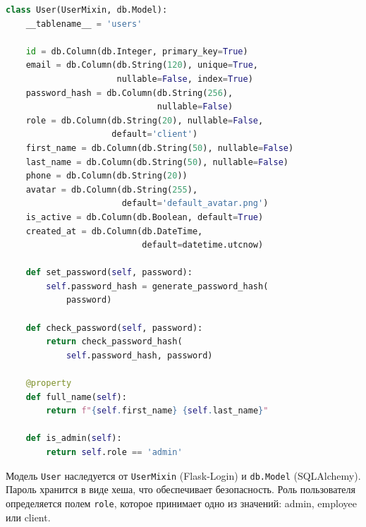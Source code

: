 \documentclass[14pt,a4paper,oneside]{extarticle}
\begin{document}
\begin{lstlisting}[language=Python, caption={Модель пользователя (User)}, label={lst:user_model}]
class User(UserMixin, db.Model):
    __tablename__ = 'users'

    id = db.Column(db.Integer, primary_key=True)
    email = db.Column(db.String(120), unique=True,
                      nullable=False, index=True)
    password_hash = db.Column(db.String(256),
                              nullable=False)
    role = db.Column(db.String(20), nullable=False,
                     default='client')
    first_name = db.Column(db.String(50), nullable=False)
    last_name = db.Column(db.String(50), nullable=False)
    phone = db.Column(db.String(20))
    avatar = db.Column(db.String(255),
                       default='default_avatar.png')
    is_active = db.Column(db.Boolean, default=True)
    created_at = db.Column(db.DateTime,
                           default=datetime.utcnow)

    def set_password(self, password):
        self.password_hash = generate_password_hash(
            password)

    def check_password(self, password):
        return check_password_hash(
            self.password_hash, password)

    @property
    def full_name(self):
        return f"{self.first_name} {self.last_name}"

    def is_admin(self):
        return self.role == 'admin'
\end{lstlisting}

Модель \texttt{User} наследуется от \texttt{UserMixin} (Flask-Login) и \texttt{db.Model} (SQLAlchemy). Пароль хранится в виде хеша, что обеспечивает безопасность. Роль пользователя определяется полем \texttt{role}, которое принимает одно из значений: admin, employee или client.
\end{document}
